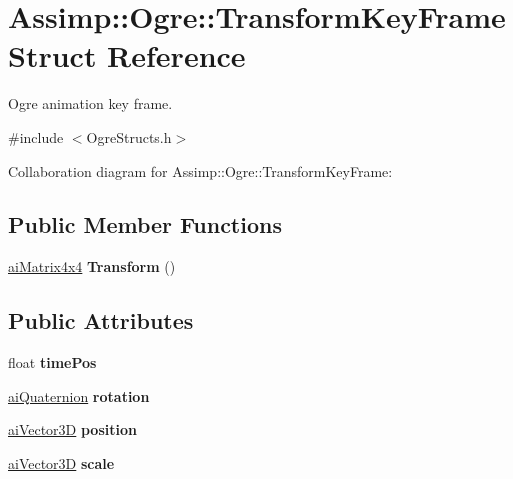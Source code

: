\hypertarget{struct_assimp_1_1_ogre_1_1_transform_key_frame}{\section{Assimp\+:\+:Ogre\+:\+:Transform\+Key\+Frame Struct Reference}
\label{struct_assimp_1_1_ogre_1_1_transform_key_frame}
}


Ogre animation key frame.  




{\ttfamily \#include $<$Ogre\+Structs.\+h$>$}



Collaboration diagram for Assimp\+:\+:Ogre\+:\+:Transform\+Key\+Frame\+:
\subsection*{Public Member Functions}
\begin{DoxyCompactItemize}
\item 
\hypertarget{struct_assimp_1_1_ogre_1_1_transform_key_frame_a944c2d99b3996df214dcd1c6289944a3}{\hyperlink{structai_matrix4x4}{ai\+Matrix4x4} {\bfseries Transform} ()}\label{struct_assimp_1_1_ogre_1_1_transform_key_frame_a944c2d99b3996df214dcd1c6289944a3}

\end{DoxyCompactItemize}
\subsection*{Public Attributes}
\begin{DoxyCompactItemize}
\item 
\hypertarget{struct_assimp_1_1_ogre_1_1_transform_key_frame_a377c3bfcca0c5b5d52f3c399b1d7743a}{float {\bfseries time\+Pos}}\label{struct_assimp_1_1_ogre_1_1_transform_key_frame_a377c3bfcca0c5b5d52f3c399b1d7743a}

\item 
\hypertarget{struct_assimp_1_1_ogre_1_1_transform_key_frame_a79a2a5f1b6e33ea96b69a7fa914fc6ca}{\hyperlink{structai_quaternion}{ai\+Quaternion} {\bfseries rotation}}\label{struct_assimp_1_1_ogre_1_1_transform_key_frame_a79a2a5f1b6e33ea96b69a7fa914fc6ca}

\item 
\hypertarget{struct_assimp_1_1_ogre_1_1_transform_key_frame_a3047f31638e2ddfabf92a4a8dd13b795}{\hyperlink{structai_vector3_d}{ai\+Vector3\+D} {\bfseries position}}\label{struct_assimp_1_1_ogre_1_1_transform_key_frame_a3047f31638e2ddfabf92a4a8dd13b795}

\item 
\hypertarget{struct_assimp_1_1_ogre_1_1_transform_key_frame_adee707061bde18056d7d53094c37108c}{\hyperlink{structai_vector3_d}{ai\+Vector3\+D} {\bfseries scale}}\label{struct_assimp_1_1_ogre_1_1_transform_key_frame_adee707061bde18056d7d53094c37108c}

\end{DoxyCompactItemize}


